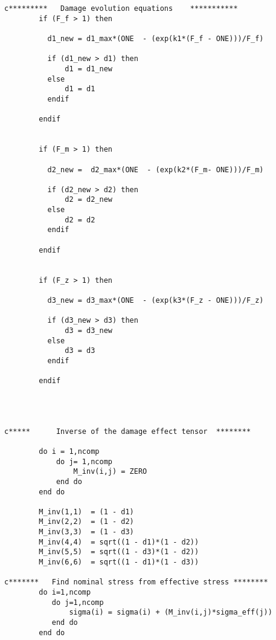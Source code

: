 \begin{lstlisting}
c*********   Damage evolution equations    *********** 	  
        if (F_f > 1) then
      
          d1_new = d1_max*(ONE  - (exp(k1*(F_f - ONE)))/F_f)
          
          if (d1_new > d1) then
              d1 = d1_new
          else
              d1 = d1
          endif          
     
        endif        

      
        if (F_m > 1) then
      
          d2_new =  d2_max*(ONE  - (exp(k2*(F_m- ONE)))/F_m)
          
          if (d2_new > d2) then
              d2 = d2_new
          else
              d2 = d2
          endif      
      
        endif
      
      
        if (F_z > 1) then
      
          d3_new = d3_max*(ONE  - (exp(k3*(F_z - ONE)))/F_z)
          
          if (d3_new > d3) then
              d3 = d3_new
          else
              d3 = d3
          endif      
          
        endif 
        

        
        
c*****      Inverse of the damage effect tensor  ********
        
        do i = 1,ncomp
            do j= 1,ncomp
                M_inv(i,j) = ZERO
            end do
        end do
        
        M_inv(1,1)  = (1 - d1)
        M_inv(2,2)  = (1 - d2)
        M_inv(3,3)  = (1 - d3)
        M_inv(4,4)  = sqrt((1 - d1)*(1 - d2))
        M_inv(5,5)  = sqrt((1 - d3)*(1 - d2))
        M_inv(6,6)  = sqrt((1 - d1)*(1 - d3))
        
c*******   Find nominal stress from effective stress ********
        do i=1,ncomp
           do j=1,ncomp
               sigma(i) = sigma(i) + (M_inv(i,j)*sigma_eff(j))        
           end do
        end do        



\end{lstlisting}

